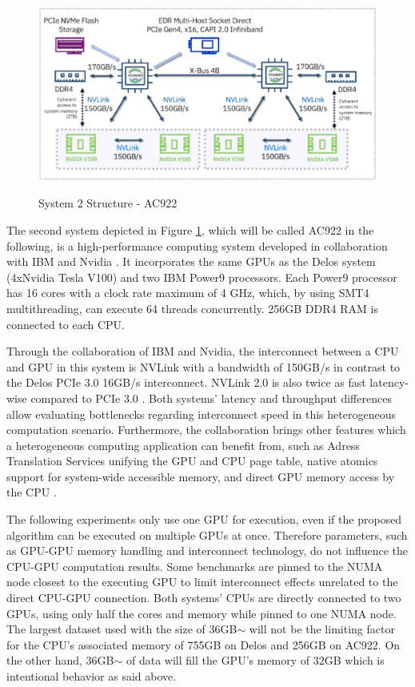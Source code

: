 \begin{figure}[H]
  \caption{System 2 Structure - AC922 \cite{ganesannarayanasamyPowerAIDeepDive12:39:24UTC}}
  \includegraphics[width=\textwidth]{figures/ac922_system_arch.png}
  \centering
  \label{fig:ac922_arch}
\end{figure}

The second system depicted in Figure \ref{fig:ac922_arch}, which will be called AC922 in the following, is a high-performance computing system developed in collaboration with IBM and Nvidia \cite{caldeiraIBMPowerSystem}. It incorporates the same GPUs as the Delos system (4xNvidia Tesla V100) and two IBM Power9 processors. Each Power9 processor has 16 cores with a clock rate maximum of 4 GHz, which, by using SMT4 multithreading, can execute 64 threads concurrently. 256GB DDR4 RAM is connected to each CPU.

Through the collaboration of IBM and Nvidia, the interconnect between a CPU and GPU in this system is NVLink \cite{NVLink2021, zargesEvaluationOnNodeGPU} with a bandwidth of 150GB/s in contrast to the Delos PCIe 3.0 16GB/s interconnect. NVLink 2.0 is also twice as fast latency-wise compared to PCIe 3.0 \cite{liEvaluatingModernGPU2020}. Both systems' latency and throughput differences allow evaluating bottlenecks regarding interconnect speed in this heterogeneous computation scenario.
Furthermore, the collaboration brings other features which a heterogeneous computing application can benefit from, such as Adress Translation Services \cite{ibmpower9nputeamFunctionalityPerformanceNVLink2018} unifying the GPU and CPU page table, native atomics support for system-wide accessible memory, and direct GPU memory access by the CPU \cite{UNIFIEDMEMORYP9}.

The following experiments only use one GPU for execution, even if the proposed algorithm can be executed on multiple GPUs at once. Therefore parameters, such as GPU-GPU memory handling and interconnect technology, do not influence the CPU-GPU computation results. Some benchmarks are pinned to the NUMA node closest to the executing GPU to limit interconnect effects unrelated to the direct CPU-GPU connection. Both systems' CPUs are directly connected to two GPUs, using only half the cores and memory while pinned to one NUMA node. The largest dataset used with the size of 36GB$\sim$ will not be the limiting factor for the CPU's associated memory of 755GB on Delos and 256GB on AC922. On the other hand, 36GB$\sim$ of data will fill the GPU's memory of 32GB which is intentional behavior as said above.

